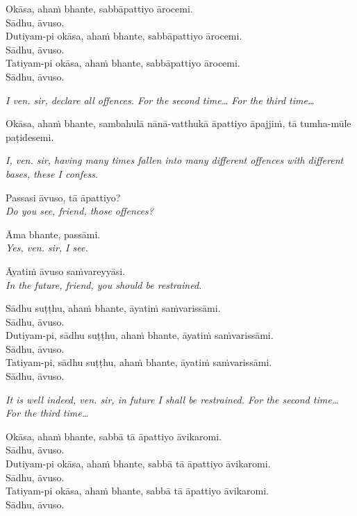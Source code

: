  Okāsa, ahaṁ bhante, sabbāpattiyo ārocemi.\\
 Sādhu, āvuso.\\
 Dutiyam-pi okāsa, ahaṁ bhante, sabbāpattiyo ārocemi.\\
 Sādhu, āvuso.\\
 Tatiyam-pi okāsa, ahaṁ bhante, sabbāpattiyo ārocemi.\\
 Sādhu, āvuso.

\emph{I ven. sir, declare all offences. For the second time… For the third time…}

 Okāsa, ahaṁ bhante, sambahulā nānā-vatthukā āpattiyo āpajjiṁ, tā tumha-mūle paṭidesemi.

\emph{I, ven. sir, having many times fallen into many different offences with different bases, these I confess.}

 Passasi āvuso, tā āpattiyo?\\
\emph{Do you see, friend, those offences?}

 Āma bhante, passāmi.\\
\emph{Yes, ven. sir, I see.}

 Āyatiṁ āvuso saṁvareyyāsi.\\
\emph{In the future, friend, you should be restrained.}

\clearpage

 Sādhu suṭṭhu, ahaṁ bhante, āyatiṁ saṁvarissāmi.\\
 Sādhu, āvuso.\\
 Dutiyam-pi, sādhu suṭṭhu, ahaṁ bhante, āyatiṁ saṁvarissāmi.\\
 Sādhu, āvuso.\\
 Tatiyam-pi, sādhu suṭṭhu, ahaṁ bhante, āyatiṁ saṁvarissāmi.\\
 Sādhu, āvuso.

\emph{It is well indeed, ven. sir, in future I shall be restrained. For the second time… For the third time…}

 Okāsa, ahaṁ bhante, sabbā tā āpattiyo āvikaromi.\\
 Sādhu, āvuso.\\
 Dutiyam-pi okāsa, ahaṁ bhante, sabbā tā āpattiyo āvikaromi.\\
 Sādhu, āvuso.\\
 Tatiyam-pi okāsa, ahaṁ bhante, sabbā tā āpattiyo āvikaromi.\\
 Sādhu, āvuso.

